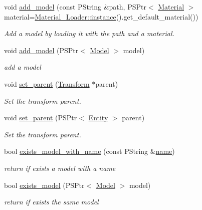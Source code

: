 \begin{DoxyCompactItemize}
void \mbox{\hyperlink{classprz_1_1_entity_ad05faa4499acdf692cbb4da278eaa329}{add\+\_\+model}} (const P\+String \&path, P\+S\+Ptr$<$ \mbox{\hyperlink{classprz_1_1_material}{Material}} $>$ material=\mbox{\hyperlink{classprz_1_1_material___loader_a5fa3903db95525602037c029debb6532}{Material\+\_\+\+Loader\+::instance}}().get\+\_\+default\+\_\+material())
\begin{DoxyCompactList}\small\item\em Add a model by loading it with the path and a material. \end{DoxyCompactList}\item 
void \mbox{\hyperlink{classprz_1_1_entity_a6006671c0683f0cfdfb827c66b7e37de}{add\+\_\+model}} (P\+S\+Ptr$<$ \mbox{\hyperlink{classprz_1_1_model}{Model}} $>$ model)
\begin{DoxyCompactList}\small\item\em add a model \end{DoxyCompactList}\item 
void \mbox{\hyperlink{classprz_1_1_entity_a78044944c6e3e9699a1f685ff6345d39}{set\+\_\+parent}} (\mbox{\hyperlink{classprz_1_1_transform}{Transform}} $\ast$parent)
\begin{DoxyCompactList}\small\item\em Set the transform parent. \end{DoxyCompactList}\item 
void \mbox{\hyperlink{classprz_1_1_entity_ad9305e51dfcade9d1b7a6aa0e5d74b2e}{set\+\_\+parent}} (P\+S\+Ptr$<$ \mbox{\hyperlink{classprz_1_1_entity}{Entity}} $>$ parent)
\begin{DoxyCompactList}\small\item\em Set the transform parent. \end{DoxyCompactList}\item 
bool \mbox{\hyperlink{classprz_1_1_entity_afd5b573b1cf1bd50bd9831facb66b3da}{exists\+\_\+model\+\_\+with\+\_\+name}} (const P\+String \&\mbox{\hyperlink{classprz_1_1_entity_a3dcb8ce07126711bf90f3272b293d980}{name}})
\begin{DoxyCompactList}\small\item\em return if exists a model with a name \end{DoxyCompactList}\item 
bool \mbox{\hyperlink{classprz_1_1_entity_a8d9500acb1c61a571864b2e4217a48cc}{exists\+\_\+model}} (P\+S\+Ptr$<$ \mbox{\hyperlink{classprz_1_1_model}{Model}} $>$ model)
\begin{DoxyCompactList}\small\item\em return if exists the same model \end{DoxyCompactList}\item 

\end{DoxyCompactItemize}
